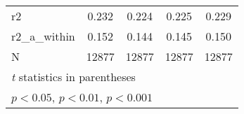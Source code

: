 {\begin{tabular}{l*{4}{c}}
\hline
r2          &       0.232         &       0.224         &       0.225         &       0.229         \\
r2\_a\_within &       0.152         &       0.144         &       0.145         &       0.150         \\
N           &       12877         &       12877         &       12877         &       12877         \\
\hline\hline
\multicolumn{5}{l}{\footnotesize \textit{t} statistics in parentheses}\\
\multicolumn{5}{l}{\footnotesize \sym{*} \(p<0.05\), \sym{**} \(p<0.01\), \sym{***} \(p<0.001\)}\\
\end{tabular}
}
